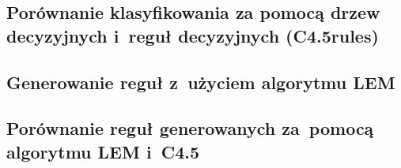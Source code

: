\documentclass{article}
\begin{document}
\subsection{Porównanie klasyfikowania za pomocą drzew decyzyjnych i~reguł decyzyjnych (C4.5rules)}

\subsection{Generowanie reguł z~użyciem algorytmu LEM}

\subsection{Porównanie reguł generowanych za~pomocą algorytmu LEM i~C4.5}





\end{document}
